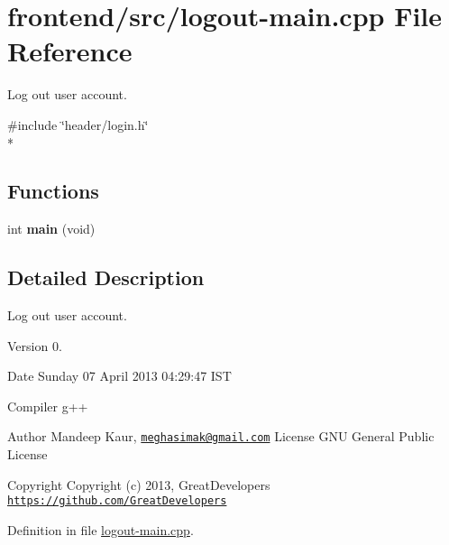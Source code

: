 \hypertarget{logout-main_8cpp}{\section{frontend/src/logout-\/main.cpp File Reference}
\label{logout-main_8cpp}
}


Log out user account.  


{\ttfamily \#include \char`\"{}header/login.\-h\char`\"{}}\\*
\subsection*{Functions}
\begin{DoxyCompactItemize}
\item 
\hypertarget{logout-main_8cpp_a840291bc02cba5474a4cb46a9b9566fe}{int {\bfseries main} (void)}\label{logout-main_8cpp_a840291bc02cba5474a4cb46a9b9566fe}

\end{DoxyCompactItemize}


\subsection{Detailed Description}
Log out user account. \begin{DoxyVersion}{Version}
0. 
\end{DoxyVersion}
\begin{DoxyDate}{Date}
Sunday 07 April 2013 04\-:29\-:47 I\-S\-T\par
Compiler g++
\end{DoxyDate}
\begin{DoxyAuthor}{Author}
Mandeep Kaur, \href{mailto:meghasimak@gmail.com}{\tt meghasimak@gmail.\-com} License G\-N\-U General Public License 
\end{DoxyAuthor}
\begin{DoxyCopyright}{Copyright}
Copyright (c) 2013, Great\-Developers \href{https://github.com/GreatDevelopers}{\tt https\-://github.\-com/\-Great\-Developers} 
\end{DoxyCopyright}


Definition in file \hyperlink{logout-main_8cpp_source}{logout-\/main.\-cpp}.

